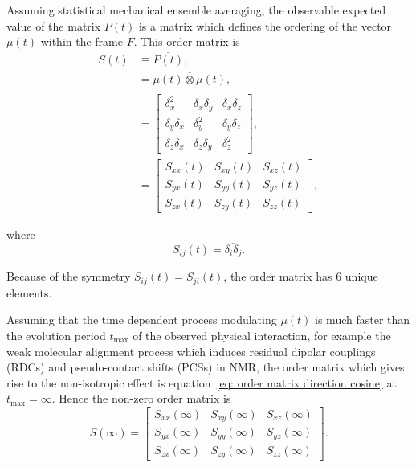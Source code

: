 Assuming statistical mechanical ensemble averaging, the observable expected value of the matrix $P(t)$ is a matrix which defines the ordering of the vector $\mu(t)$ within the frame $F$.
This order matrix is
\begin{subequations}
\begin{align}
    S(t) 
        &\equiv \overline{P(t)} , \\
        &= \overline{\mu(t) \otimes \mu(t)} , \label{eq: order matrix expected outer product} \\
        &= \overline{\begin{bmatrix}
                \delta_x^2       & \delta_x\delta_y & \delta_x\delta_z \\
                \delta_y\delta_x & \delta_y^2       & \delta_y\delta_z \\
                \delta_z\delta_x & \delta_z\delta_y & \delta_z^2
        \end{bmatrix}} , \label{eq: order matrix direction cosine} \\
        &= \begin{bmatrix}
            S_{xx}(t) & S_{xy}(t) & S_{xz}(t) \\
            S_{yx}(t) & S_{yy}(t) & S_{yz}(t) \\
            S_{zx}(t) & S_{zy}(t) & S_{zz}(t)
        \end{bmatrix} , \label{eq: order matrix}
\end{align}
\end{subequations}

where
\begin{equation}
    S_{ij}(t) = \overline{\delta_i \delta_j} .
\end{equation}

Because of the symmetry $S_{ij}(t) = S_{ji}(t)$, the order matrix has 6 unique elements.

Assuming that the time dependent process modulating $\mu(t)$ is much faster than the evolution period $t_\textrm{max}$ of the observed physical interaction, for example the weak molecular alignment process which induces residual dipolar couplings (RDCs) and pseudo-contact shifts (PCSs) in NMR, the order matrix which gives rise to the non-isotropic effect is equation~\ref{eq: order matrix direction cosine} at $t_\textrm{max} = \infty$.
Hence the non-zero order matrix is
\begin{equation}
    S(\infty) = \begin{bmatrix}
                S_{xx}(\infty) & S_{xy}(\infty) & S_{xz}(\infty) \\
                S_{yx}(\infty) & S_{yy}(\infty) & S_{yz}(\infty) \\
                S_{zx}(\infty) & S_{zy}(\infty) & S_{zz}(\infty)
              \end{bmatrix} .
\end{equation}




